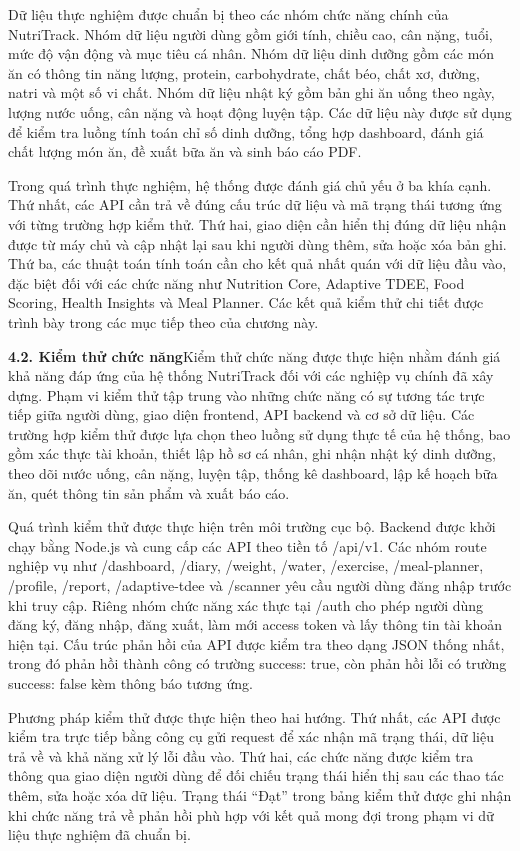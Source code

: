 Dữ liệu thực nghiệm được chuẩn bị theo các nhóm chức năng chính của NutriTrack. Nhóm dữ liệu người dùng gồm giới tính, chiều cao, cân nặng, tuổi, mức độ vận động và mục tiêu cá nhân. Nhóm dữ liệu dinh dưỡng gồm các món ăn có thông tin năng lượng, protein, carbohydrate, chất béo, chất xơ, đường, natri và một số vi chất. Nhóm dữ liệu nhật ký gồm bản ghi ăn uống theo ngày, lượng nước uống, cân nặng và hoạt động luyện tập. Các dữ liệu này được sử dụng để kiểm tra luồng tính toán chỉ số dinh dưỡng, tổng hợp dashboard, đánh giá chất lượng món ăn, đề xuất bữa ăn và sinh báo cáo PDF.

Trong quá trình thực nghiệm, hệ thống được đánh giá chủ yếu ở ba khía cạnh. Thứ nhất, các API cần trả về đúng cấu trúc dữ liệu và mã trạng thái tương ứng với từng trường hợp kiểm thử. Thứ hai, giao diện cần hiển thị đúng dữ liệu nhận được từ máy chủ và cập nhật lại sau khi người dùng thêm, sửa hoặc xóa bản ghi. Thứ ba, các thuật toán tính toán cần cho kết quả nhất quán với dữ liệu đầu vào, đặc biệt đối với các chức năng như Nutrition Core, Adaptive TDEE, Food Scoring, Health Insights và Meal Planner. Các kết quả kiểm thử chi tiết được trình bày trong các mục tiếp theo của chương này.

\textbf{4.2. Kiểm thử chức năng}Kiểm thử chức năng được thực hiện nhằm đánh giá khả năng đáp ứng của hệ thống NutriTrack đối với các nghiệp vụ chính đã xây dựng. Phạm vi kiểm thử tập trung vào những chức năng có sự tương tác trực tiếp giữa người dùng, giao diện frontend, API backend và cơ sở dữ liệu. Các trường hợp kiểm thử được lựa chọn theo luồng sử dụng thực tế của hệ thống, bao gồm xác thực tài khoản, thiết lập hồ sơ cá nhân, ghi nhận nhật ký dinh dưỡng, theo dõi nước uống, cân nặng, luyện tập, thống kê dashboard, lập kế hoạch bữa ăn, quét thông tin sản phẩm và xuất báo cáo.

Quá trình kiểm thử được thực hiện trên môi trường cục bộ. Backend được khởi chạy bằng Node.js và cung cấp các API theo tiền tố /api/v1. Các nhóm route nghiệp vụ như /dashboard, /diary, /weight, /water, /exercise, /meal-planner, /profile, /report, /adaptive-tdee và /scanner yêu cầu người dùng đăng nhập trước khi truy cập. Riêng nhóm chức năng xác thực tại /auth cho phép người dùng đăng ký, đăng nhập, đăng xuất, làm mới access token và lấy thông tin tài khoản hiện tại. Cấu trúc phản hồi của API được kiểm tra theo dạng JSON thống nhất, trong đó phản hồi thành công có trường success: true, còn phản hồi lỗi có trường success: false kèm thông báo tương ứng.

Phương pháp kiểm thử được thực hiện theo hai hướng. Thứ nhất, các API được kiểm tra trực tiếp bằng công cụ gửi request để xác nhận mã trạng thái, dữ liệu trả về và khả năng xử lý lỗi đầu vào. Thứ hai, các chức năng được kiểm tra thông qua giao diện người dùng để đối chiếu trạng thái hiển thị sau các thao tác thêm, sửa hoặc xóa dữ liệu. Trạng thái “Đạt” trong bảng kiểm thử được ghi nhận khi chức năng trả về phản hồi phù hợp với kết quả mong đợi trong phạm vi dữ liệu thực nghiệm đã chuẩn bị.

